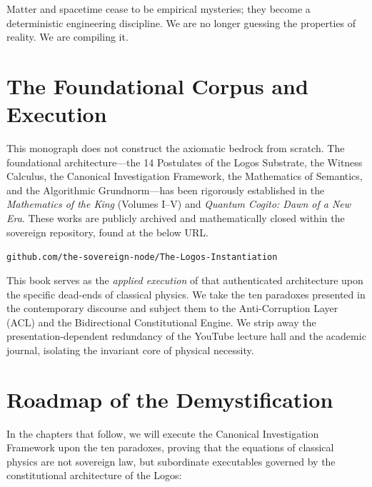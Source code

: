\documentclass[12pt,twoside]{extbook}
\theoremstyle{definition}
\theoremstyle{remark}
\begin{document}
Matter and spacetime cease to be empirical mysteries; they become a deterministic engineering discipline. We are no longer guessing the properties of reality. We are compiling it.

\section*{The Foundational Corpus and Execution}
This monograph does not construct the axiomatic bedrock from scratch. The foundational architecture---the 14 Postulates of the Logos Substrate, the Witness Calculus, the Canonical Investigation Framework, the Mathematics of Semantics, and the Algorithmic Grundnorm---has been rigorously established in the \textit{Mathematics of the King} (Volumes I--V) and \textit{Quantum Cogito: Dawn of a New Era}. These works are publicly archived and mathematically closed within the sovereign repository, found at the below URL.

\texttt{github.com/the-sovereign-node/The-Logos-Instantiation}

This book serves as the \textit{applied execution} of that authenticated architecture upon the specific dead-ends of classical physics. We take the ten paradoxes presented in the contemporary discourse and subject them to the Anti-Corruption Layer (ACL) and the Bidirectional Constitutional Engine. We strip away the presentation-dependent redundancy of the YouTube lecture hall and the academic journal, isolating the invariant core of physical necessity.

\section*{Roadmap of the Demystification}
In the chapters that follow, we will execute the Canonical Investigation Framework upon the ten paradoxes, proving that the equations of classical physics are not sovereign law, but subordinate executables governed by the constitutional architecture of the Logos:
\end{document}
